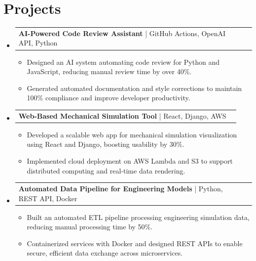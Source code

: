 \documentclass[letterpaper,11pt]{article}
\makeatletter
\newcommand{\resumeItem}[1]{
  \item\footnotesize{
    {#1 \vspace{-2pt}}
  }
}
\newcommand{\resumeProjectHeading}[2]{
    \item
    \begin{tabular*}{1.001\textwidth}{l@{\extracolsep{\fill}}r}
      \small#1 & \textbf{\small #2}\\
    \end{tabular*}\vspace{-7pt}
}
\newcommand{\resumeSubHeadingListStart}{\begin{itemize}[leftmargin=0pt, label={}]}
\newcommand{\resumeSubHeadingListEnd}{\end{itemize}}
\newcommand{\resumeItemListStart}{\begin{itemize}[leftmargin=*]}
\newcommand{\resumeItemListEnd}{\end{itemize}\vspace{-5pt}}
\makeatother
\begin{document}
\section{Projects}
    \vspace{-5pt}
    \resumeSubHeadingListStart
      \resumeProjectHeading
          {\textbf{AI-Powered Code Review Assistant} | GitHub Actions, OpenAI API, Python}{}
          \resumeItemListStart
              \resumeItem{Designed an AI system automating code review for Python and JavaScript, reducing manual review time by over 40\%.}
              \resumeItem{Generated automated documentation and style corrections to maintain 100\% compliance and improve developer productivity.}
          \resumeItemListEnd
          \vspace{-12pt}
      \resumeProjectHeading
          {\textbf{Web-Based Mechanical Simulation Tool} | React, Django, AWS}{}
          \resumeItemListStart
              \resumeItem{Developed a scalable web app for mechanical simulation visualization using React and Django, boosting usability by 30\%.}
              \resumeItem{Implemented cloud deployment on AWS Lambda and S3 to support distributed computing and real-time data rendering.}
          \resumeItemListEnd
          \vspace{-12pt}
      \resumeProjectHeading
          {\textbf{Automated Data Pipeline for Engineering Models} | Python, REST API, Docker}{}
          \resumeItemListStart
              \resumeItem{Built an automated ETL pipeline processing engineering simulation data, reducing manual processing time by 50\%.}
              \resumeItem{Containerized services with Docker and designed REST APIs to enable secure, efficient data exchange across microservices.}
          \resumeItemListEnd 
    \resumeSubHeadingListEnd
\end{document}
